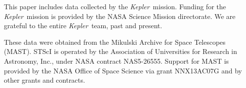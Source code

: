 \documentclass[manuscript, letterpaper]{aastex6}
\newcommand{\project}[1]{\textsl{#1}}
\newcommand{\kepler}{\project{Kepler}}
\begin{document}
This paper includes data collected by the \kepler\ mission. Funding for the
\kepler\ mission is provided by the NASA Science Mission directorate.
We are grateful to the entire \kepler\ team, past and present.

These data were obtained from the Mikulski Archive for Space Telescopes
(MAST).
STScI is operated by the Association of Universities for Research in
Astronomy, Inc., under NASA contract NAS5-26555.
Support for MAST is provided by the NASA Office of Space Science via grant
NNX13AC07G and by other grants and contracts.

\software{%
}

\appendix


\end{document}
